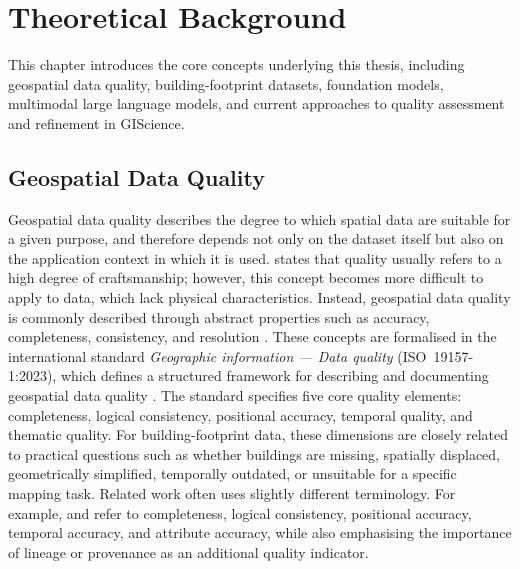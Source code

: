 \chapter{Theoretical Background}

This chapter introduces the core concepts underlying this thesis, including geospatial data quality, building-footprint datasets, foundation models, multimodal large language models, and current approaches to quality assessment and refinement in GIScience.


\section{Geospatial Data Quality}
\label{sec:geospatial_data_quality}

Geospatial data quality describes the degree to which spatial data are suitable for a given purpose, and therefore depends not only on the dataset itself but also on the application context in which it is used.
\citet{veregin1999data} states that quality usually refers to a high degree of craftsmanship; however, this concept becomes more difficult to apply to data, which lack physical characteristics. Instead, geospatial data quality is commonly described through abstract properties such as accuracy, completeness, consistency, and resolution \citep{veregin1999data}.
These concepts are formalised in the international standard \textit{Geographic information — Data quality} (ISO~19157-1:2023), which defines a structured framework for describing and documenting geospatial data quality \citep{ISO19157-1:2023}. The standard specifies five core quality elements: completeness, logical consistency, positional accuracy, temporal quality, and thematic quality. For building-footprint data, these dimensions are closely related to practical questions such as whether buildings are missing, spatially displaced, geometrically simplified, temporally outdated, or unsuitable for a specific mapping task. Related work often uses slightly different terminology. For example, \citet{Vieira_dataqualityindicators} and \citet{dataqualityinEarthobservation} refer to completeness, logical consistency, positional accuracy, temporal accuracy, and attribute accuracy, while also emphasising the importance of lineage or provenance as an additional quality indicator.

